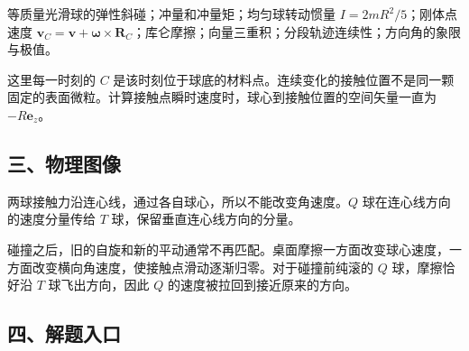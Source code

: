 \documentclass[12pt,a4paper,fontset=fandol]{ctexart}
\begin{document}
等质量光滑球的弹性斜碰；冲量和冲量矩；均匀球转动惯量
\(I=2mR^2/5\)；刚体点速度
\(\boldsymbol v_C=\boldsymbol v+\boldsymbol\omega\times\boldsymbol R_C\)；库仑摩擦；向量三重积；分段轨迹连续性；方向角的象限与极值。

这里每一时刻的 \(C\)
是该时刻位于球底的材料点。连续变化的接触位置不是同一颗固定的表面微粒。计算接触点瞬时速度时，球心到接触位置的空间矢量一直为
\(-R\boldsymbol e_z\)。

\subsection{三、物理图像}\label{ux4e09ux7269ux7406ux56feux50cf-1}

两球接触力沿连心线，通过各自球心，所以不能改变角速度。\(Q\)
球在连心线方向的速度分量传给 \(T\) 球，保留垂直连心线方向的分量。

碰撞之后，旧的自旋和新的平动通常不再匹配。桌面摩擦一方面改变球心速度，一方面改变横向角速度，使接触点滑动逐渐归零。对于碰撞前纯滚的
\(Q\) 球，摩擦恰好沿 \(T\) 球飞出方向，因此 \(Q\)
的速度被拉回到接近原来的方向。

\begin{center}
\begin{minipage}{\linewidth}
\centering\begingroup
{}
\ifdim\wd\diagrambox>.88\linewidth
\sbox{\diagrambox}{\resizebox{.88\linewidth}{!}{\usebox{\diagrambox}}}
\fi
\ifdim\ht\diagrambox>.40\textheight
\resizebox{!}{.40\textheight}{\usebox{\diagrambox}}
\else\usebox{\diagrambox}\fi
\par{}
\endgroup\end{minipage}
\end{center}

\subsection{四、解题入口}\label{ux56dbux89e3ux9898ux5165ux53e3-1}
\end{document}
